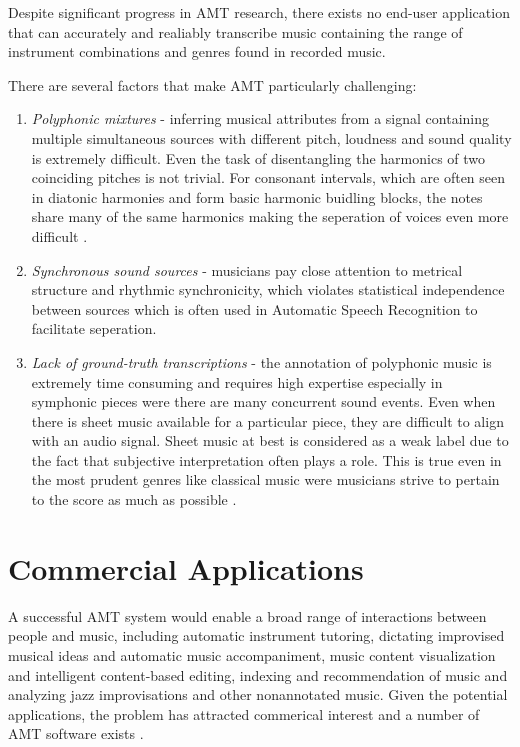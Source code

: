 Despite significant progress in \ac{AMT} research, there exists no end-user application that
can accurately and realiably transcribe music containing the range of instrument combinations and
genres found in recorded music.

There are several factors that make AMT particularly challenging:

\begin{enumerate}
      \item \emph{Polyphonic mixtures} - inferring musical attributes from a
            signal containing multiple simultaneous sources with different
            pitch, loudness and sound quality is extremely difficult. Even the
            task of disentangling the harmonics of two coinciding pitches is not
            trivial. For consonant intervals, which are often seen in diatonic
            harmonies and form basic harmonic buidling blocks, the notes share
            many of the same harmonics making the seperation of voices even more
            difficult \cite{ISMIR-tut:Benetos}.
      \item \emph{Synchronous sound sources} - musicians pay close attention to
            metrical structure and rhythmic synchronicity, which violates
            statistical independence between sources which is often used in
            Automatic Speech Recognition to facilitate seperation.
      \item \emph{Lack of ground-truth transcriptions} - the annotation of
            polyphonic music is extremely time consuming and requires high
            expertise especially in symphonic pieces were there are many
            concurrent sound events. Even when there is sheet music available
            for a particular piece, they are difficult to align with an audio
            signal. Sheet music at best is considered as a weak label due to the
            fact that subjective interpretation often plays a role. This is true
            even in the most prudent genres like classical music were musicians
            strive to pertain to the score as much as possible
            \cite{ground-truths:Su}.
\end{enumerate}

\section{Commercial Applications}

A successful \ac{AMT} system would enable a broad range of interactions between
people and music, including automatic instrument tutoring, dictating improvised
musical ideas and automatic music accompaniment, music content visualization and
intelligent content-based editing, indexing and recommendation of music and
analyzing jazz improvisations and other nonannotated music. Given the potential
applications, the problem has attracted commerical interest and a number of AMT
software exists \cite{amtfc2013:Benetos}.

